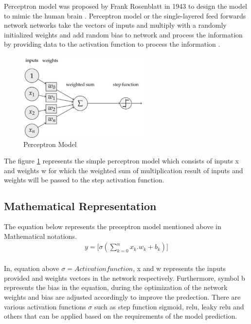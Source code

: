 Perceptron model was proposed by Frank Rosenblatt in 1943 to design the model to 
mimic the human brain \citep{939589}. Perceptron model or the single-layered feed forwards network 
networks take the vectors of inputs and multiply with a randomly 
initialized weights and add random bias to network and process the information by providing data to the
activation function to process the information \citep{AGATONOVICKUSTRIN2000717}.
\pagebreak

\begin{figure}[!htp]
    \centering
    \includegraphics[width=0.6\textwidth]{Images/p_model.png} 
    \caption{Perceptron Model}
    \label{figure:perceptron}
\end{figure}
The figure \ref{figure:perceptron} represents the simple perceptron model which consists of inputs x and weights w 
for which the weighted sum of multiplication result of 
inputs and weights will be passed to the step activation function.

\subsection{Mathematical Representation }
\vspace{3mm}
{The equation below represents the preceptron model mentioned above in Mathematical notations.}
\begin{equation}
    \begin{split}
        y = \Big[\sigma(\sum_{k=0}^n x_k.w_k + b_k)\Big] \\
    \end{split}
\end{equation}

     {
        In, equation above ${\sigma = Activation function}$, x and w represents the inputs provided 
        and weights vectors in the network respectively. Furthermore, symbol b represents the bias in the equation, 
        during the optimization of the network weights and bias are adjusted accordingly to improve the predection. There are various activation functions ${\sigma}$ such as step function sigmoid, 
        relu, leaky relu and others that can be applied based on the requirements of the model prediction.
    }